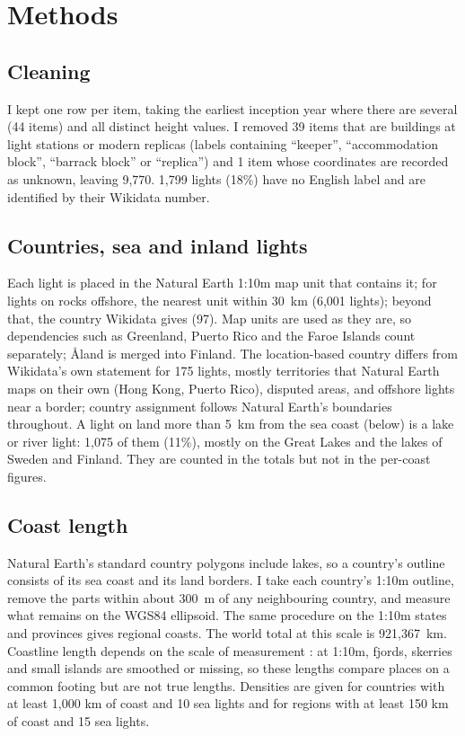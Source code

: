 \documentclass[11pt,a4paper]{article}
\begin{document}
\section{Methods}
\subsection{Cleaning}
I kept one row per item, taking the earliest inception year where there are several (44 items) and all distinct height values. I removed 39 items that are buildings at light stations or modern replicas (labels containing ``keeper'', ``accommodation block'', ``barrack block'' or ``replica'') and 1 item whose coordinates are recorded as unknown, leaving 9,770. 1,799 lights (18\%) have no English label and are identified by their Wikidata number.

\subsection{Countries, sea and inland lights}
Each light is placed in the Natural Earth 1:10m map unit that contains it; for lights on rocks offshore, the nearest unit within 30~km (6,001 lights); beyond that, the country Wikidata gives (97). Map units are used as they are, so dependencies such as Greenland, Puerto Rico and the Faroe Islands count separately; Åland is merged into Finland. The location-based country differs from Wikidata's own statement for 175 lights, mostly territories that Natural Earth maps on their own (Hong Kong, Puerto Rico), disputed areas, and offshore lights near a border; country assignment follows Natural Earth's boundaries throughout. A light on land more than 5~km from the sea coast (below) is a lake or river light: 1,075 of them (11\%), mostly on the Great Lakes and the lakes of Sweden and Finland. They are counted in the totals but not in the per-coast figures.

\subsection{Coast length}
Natural Earth's standard country polygons include lakes, so a country's outline consists of its sea coast and its land borders. I take each country's 1:10m outline, remove the parts within about 300~m of any neighbouring country, and measure what remains on the WGS84 ellipsoid. The same procedure on the 1:10m states and provinces gives regional coasts. The world total at this scale is 921,367~km. Coastline length depends on the scale of measurement \citep{mandelbrot}: at 1:10m, fjords, skerries and small islands are smoothed or missing, so these lengths compare places on a common footing but are not true lengths. Densities are given for countries with at least 1,000 km of coast and 10 sea lights and for regions with at least 150 km of coast and 15 sea lights.
\end{document}
